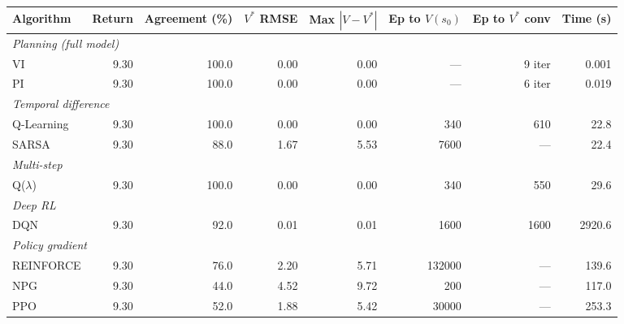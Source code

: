 \begin{tabular}{lrrrrrrr}
\hline
Algorithm & Return & Agreement (\%) & $V^*$ RMSE & Max $|V{-}V^*|$ & Ep to $V(s_0)$ & Ep to $V^*$ conv & Time (s) \\
\hline
\multicolumn{8}{l}{\emph{Planning (full model)}} \\
VI & 9.30 & 100.0 & 0.00 & 0.00 & --- & 9 iter & 0.001 \\
PI & 9.30 & 100.0 & 0.00 & 0.00 & --- & 6 iter & 0.019 \\
\hline
\multicolumn{8}{l}{\emph{Temporal difference}} \\
Q-Learning & 9.30 & 100.0 & 0.00 & 0.00 & 340 & 610 & 22.8 \\
SARSA & 9.30 & 88.0 & 1.67 & 5.53 & 7600 & --- & 22.4 \\
\hline
\multicolumn{8}{l}{\emph{Multi-step}} \\
Q($\lambda$) & 9.30 & 100.0 & 0.00 & 0.00 & 340 & 550 & 29.6 \\
\hline
\multicolumn{8}{l}{\emph{Deep RL}} \\
DQN & 9.30 & 92.0 & 0.01 & 0.01 & 1600 & 1600 & 2920.6 \\
\hline
\multicolumn{8}{l}{\emph{Policy gradient}} \\
REINFORCE & 9.30 & 76.0 & 2.20 & 5.71 & 132000 & --- & 139.6 \\
NPG & 9.30 & 44.0 & 4.52 & 9.72 & 200 & --- & 117.0 \\
PPO & 9.30 & 52.0 & 1.88 & 5.42 & 30000 & --- & 253.3 \\
\hline
\end{tabular}